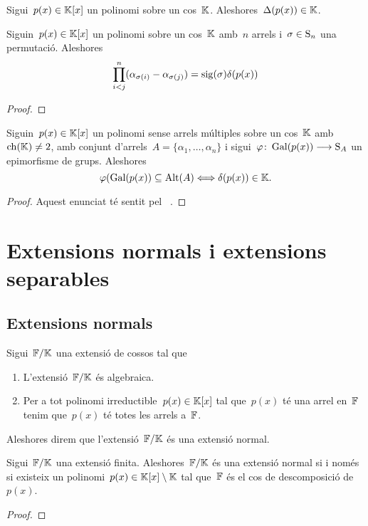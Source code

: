\documentclass[../../Main.tex]{subfiles}
\begin{document}
	\begin{proposition}
		\label{prop:el discriminant pertany al cos del polinomi}
		Sigui~\(p(x)\in\mathbb{K}[x]\) un polinomi sobre un cos~\(\mathbb{K}\). Aleshores~\(\Delta(p(x))\in\mathbb{K}\).
	\end{proposition}
	\begin{lemma}
		\label{lema:discriminant}
		Siguin~\(p(x)\in\mathbb{K}[x]\) un polinomi sobre un cos~\(\mathbb{K}\) amb~\(n\) arrels i~\(\sigma\in\operatorname{S}_{n}\) una permutació. Aleshores
		\[
		    \prod_{i<j}^{n}(\alpha_{\sigma(i)}-\alpha_{\sigma(j)})=\operatorname{sig}(\sigma)\delta(p(x))
		\]
		\begin{proof}
		\end{proof}
	\end{lemma}
	\begin{corollary}
		\label{cor:l'arrel del discriminant d'un polinomi pertany al cos si i només si el grup de Galois del polinomi és un subgrup dels alternats de les arrels}
		Siguin~\(p(x)\in\mathbb{K}[x]\) un polinomi sense arrels múltiples sobre un cos~\(\mathbb{K}\) amb~\(\operatorname{ch}(\mathbb{K})\neq2\), amb conjunt d'arrels~\(A=\{\alpha_{1},\dots,\alpha_{n}\}\) i sigui~\(\varphi\colon\operatorname{Gal}(p(x))\longrightarrow\operatorname{S}_{A}\) un epimorfisme de grups.
		Aleshores
		\[
		    \varphi(\operatorname{Gal}(p(x))\subseteq\operatorname{Alt}(A)\Longleftrightarrow\delta(p(x))\in\mathbb{K}.
		\]
		\begin{proof}
			Aquest enunciat té sentit pel \corollari~.
		\end{proof}
	\end{corollary}
	
	\section{Extensions normals i extensions separables}
\subsection{Extensions normals}
	\begin{definition}
		\label{def:extensió normal}
		Sigui~\(\mathbb{F}/\mathbb{K}\) una extensió de cossos tal que
		\begin{enumerate}
			\item L'extensió~\(\mathbb{F}/\mathbb{K}\) és algebraica.
			\item Per a tot polinomi irreductible~\(p(x)\in\mathbb{K}[x]\) tal que~\(p(x)\) té una arrel en~\(\mathbb{F}\) tenim que~\(p(x)\) té totes les arrels a~\(\mathbb{F}\).
		\end{enumerate}
		Aleshores direm que l'extensió~\(\mathbb{F}/\mathbb{K}\) és una extensió normal.
	\end{definition}
	\begin{theorem}
		\label{thm:Teorema de normalitat}
		Sigui~\(\mathbb{F}/\mathbb{K}\) una extensió finita. Aleshores~\(\mathbb{F}/\mathbb{K}\) és una extensió normal si i només si existeix un polinomi~\(p(x)\in\mathbb{K}[x]\setminus\mathbb{K}\) tal que~\(\mathbb{F}\) és el cos de descomposició de~\(p(x)\).
		\begin{proof}
		\end{proof}
	\end{theorem}
\end{document}
